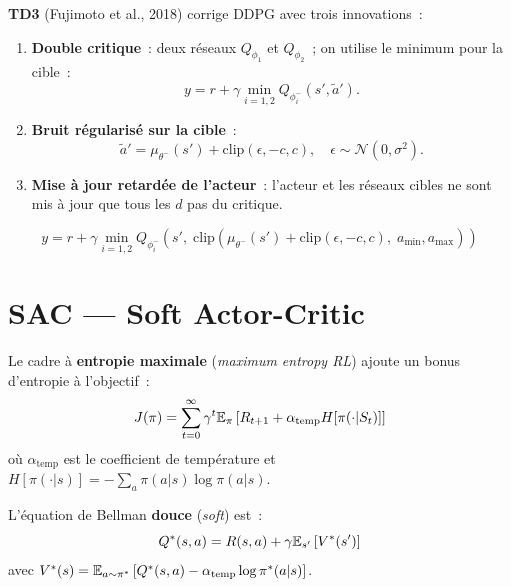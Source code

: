 \begin{definition}[TD3]
\textbf{TD3} (Fujimoto et al., 2018) corrige DDPG avec trois innovations~:
\begin{enumerate}
    \item \textbf{Double critique}~: deux r\'eseaux $Q_{\phi_1}$ et $Q_{\phi_2}$~;
    on utilise le minimum pour la cible~:
    \[
        y = r + \gamma \min_{i=1,2} Q_{\phi_i^-}(s', \tilde{a}').
    \]
    \item \textbf{Bruit r\'egularis\'e sur la cible}~:
    \[
        \tilde{a}' = \mu_{\theta^-}(s') + \text{clip}(\epsilon, -c, c), \quad
        \epsilon \sim \mathcal{N}(0, \sigma^2).
    \]
    \item \textbf{Mise \`a jour retard\'ee de l'acteur}~: l'acteur et les r\'eseaux
    cibles ne sont mis \`a jour que tous les $d$ pas du critique.
\end{enumerate}
\end{definition}

\begin{formules}[title=\textbf{Cible TD3}]
\[
    y = r + \gamma \min_{i=1,2} Q_{\phi_i^-}\!\left(s', \;
    \text{clip}\!\left(\mu_{\theta^-}(s') + \text{clip}(\epsilon, -c, c),\;
    a_{\min}, a_{\max}\right)\right)
\]
\end{formules}

\section{SAC --- Soft Actor-Critic}

\begin{definition}
Le cadre \`a \textbf{entropie maximale} (\emph{maximum entropy RL}) ajoute
un bonus d'entropie \`a l'objectif~:
\[
    J(\pi) = \sum_{t=0}^{\infty} \gamma^t \mathbb{E}_{\pi}\left[
    R_{t+1} + \alpha_{\text{temp}} H[\pi(\cdot | S_t)]
    \right]
\]
o\`u $\alpha_{\text{temp}}$ est le coefficient de temp\'erature et
$H[\pi(\cdot|s)] = -\sum_a \pi(a|s) \log \pi(a|s)$.
\end{definition}

\begin{definition}
L'\'equation de Bellman \textbf{douce} (\emph{soft}) est~:
\[
    Q^*(s,a) = R(s,a) + \gamma \mathbb{E}_{s'}\left[V^*(s')\right]
\]
avec $V^*(s) = \mathbb{E}_{a \sim \pi^*}\left[Q^*(s,a) - \alpha_{\text{temp}} \log \pi^*(a|s)\right]$.
\end{definition}

